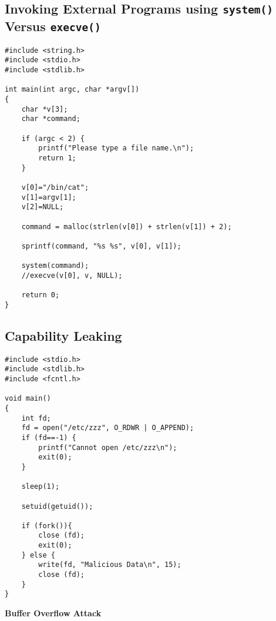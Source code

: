 \documentclass[a4paper,12pt]{article}
\begin{document}
\subsection{Invoking External Programs using \texttt{system()} Versus \texttt{execve()}}
\label{Appsec:3.8}
\begin{verbatim}
#include <string.h>
#include <stdio.h>
#include <stdlib.h>

int main(int argc, char *argv[])
{
    char *v[3];
    char *command;

    if (argc < 2) {
        printf("Please type a file name.\n");
        return 1;
    }

    v[0]="/bin/cat";
    v[1]=argv[1];
    v[2]=NULL;

    command = malloc(strlen(v[0]) + strlen(v[1]) + 2);

    sprintf(command, "%s %s", v[0], v[1]);

    system(command);
    //execve(v[0], v, NULL);

    return 0;
}
\end{verbatim}
\newpage
\subsection{Capability Leaking}
\label{Appsec:3.9}
\begin{verbatim}
#include <stdio.h>
#include <stdlib.h>
#include <fcntl.h>

void main()
{
    int fd;
    fd = open("/etc/zzz", O_RDWR | O_APPEND);
    if (fd==-1) {
        printf("Cannot open /etc/zzz\n");
        exit(0);
    }

    sleep(1);

    setuid(getuid());

    if (fork()){
        close (fd);
        exit(0);
    } else {
        write(fd, "Malicious Data\n", 15);
        close (fd);
    }
}
\end{verbatim}











\begin{titlepage}
	\begin{center}
		\vspace*{27em}
		\Huge
		\textbf{Buffer Overflow Attack\\}		
		
		\vfill
	\end{center}
\end{titlepage}
\end{document}

